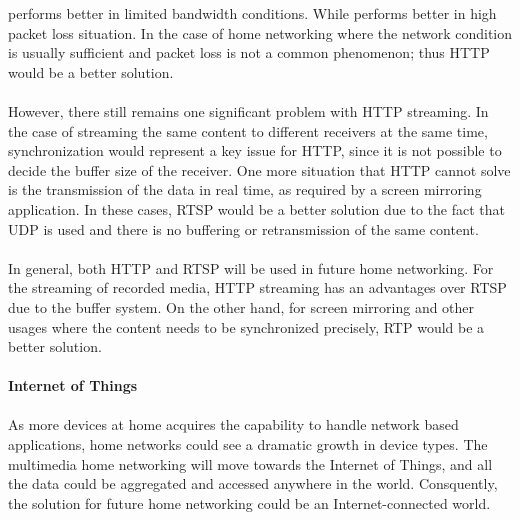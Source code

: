 performs better in limited bandwidth conditions. While performs better in high
packet loss situation. In the case of home networking where the network
condition is usually sufficient and packet loss is not a common phenomenon; thus
HTTP would be a better solution. \\
\\
However, there still remains one significant problem with HTTP streaming. In the
case of streaming the same content to different receivers at the same time,
synchronization would represent a key issue for HTTP, since it is not possible
to decide the buffer size of the receiver. One more situation that HTTP cannot
solve is the transmission of the data in real time, as required by a screen
mirroring application. In these cases, RTSP would be a better solution due to
the fact that UDP is used and there is no buffering or retransmission of the
same content.\\
\\
In general, both HTTP and RTSP will be used in future home networking. For
the streaming of recorded media, HTTP streaming has an advantages over RTSP
due to the buffer system. On the other hand, for screen mirroring and other
usages where the content needs to be synchronized precisely, RTP would be a
better solution.\\
\\
\textbf{Internet of Things}\\
\\
As more devices at home acquires the capability to handle network based
applications, home networks could see a dramatic growth in device types. The
multimedia home networking will move towards the Internet of Things, and all
the data could be aggregated and accessed anywhere in the world. Consquently,
the solution for future home networking could be an Internet-connected
world.
